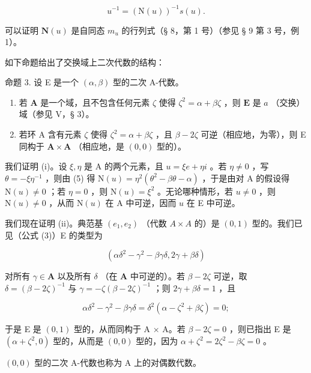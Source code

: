 \[
u ^ {- 1} = (\mathrm{N} (u)) ^ {- 1} s (u).\tag{8}
\]

可以证明 \(\mathbf{N}(u)\) 是自同态 \(m_u\) 的行列式（§ 8，第 1 号）（参见 § 9 第 3 号，例 1）。

如下命题给出了交换域上二次代数的结构：

命题 3. 设 E 是一个 \((\alpha, \beta)\) 型的二次 A-代数。

\begin{enumerate}
\def\labelenumi{(\roman{enumi})}
\item
  若 \(\mathbf{A}\) 是一个域，且不包含任何元素 \(\zeta\) 使得 \(\zeta^2 = \alpha + \beta \zeta\) ，则 \(\mathbf{E}\) 是 \(a\) （交换）域（参见 V，§ 3）。
\item
  若环 A 含有元素 \(\zeta\) 使得 \(\zeta^2 = \alpha + \beta\zeta\) ，且 \(\beta - 2\zeta\) 可逆（相应地，为零），则 E 同构于 \(\mathbf{A} \times \mathbf{A}\) （相应地，是 \((0,0)\) 型的）。
\end{enumerate}

我们证明 (i)。设 \(\xi, \eta\) 是 A 的两个元素，且 \(u = \xi e + \eta i\) 。若 \(\eta \neq 0\) ，写 \(\theta = -\xi \eta^{-1}\) ，则由 (5) 得 \(\mathrm{N}(u) = \eta^2 (\theta^2 - \beta \theta - \alpha)\) ，于是由对 A 的假设得 \(\mathrm{N}(u) \neq 0\) ；若 \(\eta = 0\) ，则 \(\mathrm{N}(u) = \xi^2\) 。无论哪种情形，若 \(u \neq 0\) ，则 \(\mathrm{N}(u) \neq 0\) ，从而 \(\mathrm{N}(u)\) 在 A 中可逆，因而 \(u\) 在 E 中可逆。

我们现在证明 (ii)。典范基 \((e_{1}, e_{2})\) （代数 \(A \times A\) 的）是 \((0, 1)\) 型的。我们已见（公式 (3)）E 的类型为

\[
(\alpha \delta^ {2} - \gamma^ {2} - \beta \gamma \delta , 2 \gamma + \beta \delta)
\]

对所有 \(\gamma \in \mathbf{A}\) 以及所有 \(\delta\) （在 \(\mathbf{A}\) 中可逆的）。若 \(\beta - 2\zeta\) 可逆，取 \(\delta = (\beta - 2\zeta)^{-1}\) 与 \(\gamma = -\zeta(\beta - 2\zeta)^{-1}\) ；则 \(2\gamma + \beta\delta = 1\) ，且

\[
\alpha \delta^ {2} - \gamma^ {2} - \beta \gamma \delta = \delta^ {2} (\alpha - \zeta^ {2} + \beta \zeta) = 0;
\]

于是 E 是 \((0,1)\) 型的，从而同构于 A × A。若 \(\beta - 2\zeta = 0\) ，则已指出 E 是 \((\alpha + \zeta^{2}, 0)\) 型的，从而是 \((0,0)\) 型的，因为 \(\alpha + \zeta^{2} = 2\zeta^{2} - \beta\zeta = 0\) 。

\((0,0)\) 型的二次 A-代数也称为 A 上的对偶数代数。

